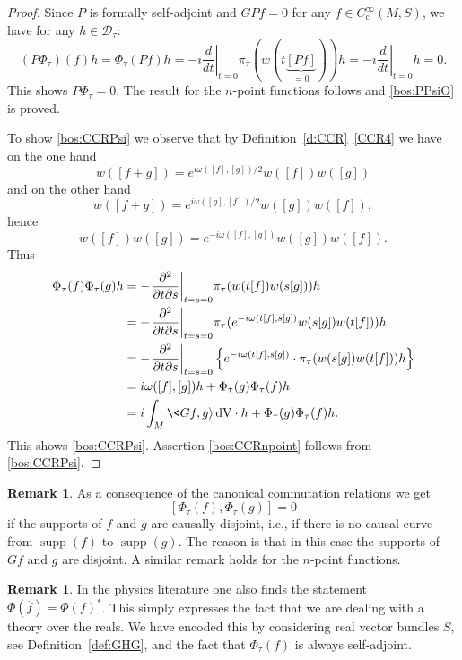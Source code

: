 \documentclass[a4paper,11pt]{amsart}
\theoremstyle{definition}
\newtheorem{rem}[thm]{Remark}
\begin{document}
\begin{proof}
Since $P$ is formally self-adjoint and $GPf=0$ for any $f\in{C^\infty_\mathrm{c}}(M,S)$, we have for any $h\in{\mathcal{D}}_\tau$:
$$
(P\Phi_\tau)(f)h = \Phi_\tau(Pf)h = -i{\left.\frac{d}{dt}\right|_{t=0}} \pi_\tau (w(t\underbrace{[Pf]}_{=0}))h = -i {\left.\frac{d}{dt}\right|_{t=0}} h = 0.
$$
This shows $P\Phi_\tau=0$.
The result for the $n$-point functions follows and \eqref{bos:PPsiO} is proved.

To show \eqref{bos:CCRPsi} we observe that by Definition~\ref{d:CCR}~\eqref{CCR4} we have on the one hand
$$
w([f+g]) = e^{i\omega([f],[g])/2}w([f])w([g])
$$
and on the other hand
$$
w([f+g]) = e^{i\omega([g],[f])/2}w([g])w([f]),
$$
hence
$$
w([f])w([g]) = e^{-i\omega([f],[g])}w([g])w([f]) .
$$
Thus
\begin{align*}
\Phi_\tau(f)\Phi_\tau(g)h
&=
-{\left.\frac{\partial^2}{\partial t \partial s}\right|_{t=s=0}} \pi_\tau(w(t[f])w(s[g]))h \\
&=
-{\left.\frac{\partial^2}{\partial t \partial s}\right|_{t=s=0}} \pi_\tau(e^{-i\omega(t[f],s[g])}w(s[g])w(t[f]))h \\
&=
-{\left.\frac{\partial^2}{\partial t \partial s}\right|_{t=s=0}} \left\{e^{-i\omega(t[f],s[g])}\cdot\pi_\tau(w(s[g])w(t[f]))h\right\} \\
&=
i\omega([f],[g])h + \Phi_\tau(g)\Phi_\tau(f)h \\
&=
i\int_M\<Gf,g{\rangle}{\,\mathrm{dV}}\cdot h  + \Phi_\tau(g)\Phi_\tau(f)h.
\end{align*}
This shows \eqref{bos:CCRPsi}.
Assertion \eqref{bos:CCRnpoint} follows from \eqref{bos:CCRPsi}.
\end{proof}

\begin{rem}
As a consequence of the canonical commutation relations we get
$$
[\Phi_\tau(f),\Phi_\tau(g)]=0
$$
if the supports of $f$ and $g$ are causally disjoint, i.e., if there is no causal curve from ${\operatorname{supp}}(f)$ to ${\operatorname{supp}}(g)$.
The reason is that in this case the supports of $Gf$ and $g$ are disjoint.
A similar remark holds for the $n$-point functions.
\end{rem}

\begin{rem}
In the physics literature one also finds the statement $\Phi(\overline f) = \Phi(f)^*$.
This simply expresses the fact that we are dealing with a theory over the reals.
We have encoded this by considering real vector bundles $S$, see Definition~\ref{def:GHG}, and the fact that $\Phi_\tau(f)$ is always self-adjoint.
\end{rem}
\end{document}
